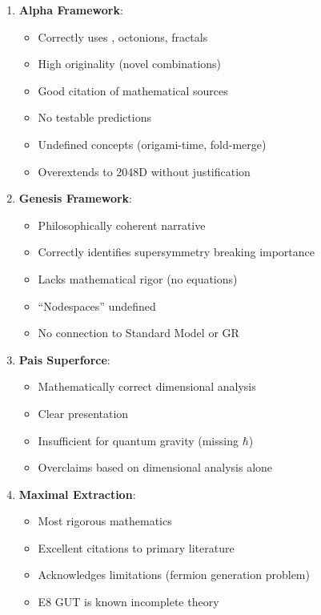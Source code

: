 \begin{enumerate}
    \item \textbf{Alpha Framework}:
    \begin{itemize}
        \item[+] Correctly uses , octonions, fractals
        \item[+] High originality (novel combinations)
        \item[+] Good citation of mathematical sources
        \item[$-$] No testable predictions
        \item[$-$] Undefined concepts (origami-time, fold-merge)
        \item[$-$] Overextends to 2048D without justification
    \end{itemize}

    \item \textbf{Genesis Framework}:
    \begin{itemize}
        \item[+] Philosophically coherent narrative
        \item[+] Correctly identifies supersymmetry breaking importance
        \item[$-$] Lacks mathematical rigor (no equations)
        \item[$-$] ``Nodespaces'' undefined
        \item[$-$] No connection to Standard Model or GR
    \end{itemize}

    \item \textbf{Pais Superforce}:
    \begin{itemize}
        \item[+] Mathematically correct dimensional analysis
        \item[+] Clear presentation
        \item[$-$] Insufficient for quantum gravity (missing $\hbar$)
        \item[$-$] Overclaims based on dimensional analysis alone
    \end{itemize}

    \item \textbf{Maximal Extraction}:
    \begin{itemize}
        \item[+] Most rigorous mathematics
        \item[+] Excellent citations to primary literature
        \item[+] Acknowledges limitations (fermion generation problem)
        \item[$\sim$] E8 GUT is known incomplete theory
    \end{itemize}
\end{enumerate}


